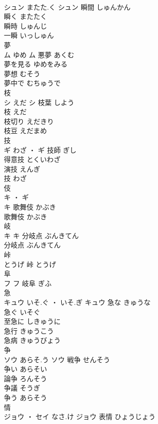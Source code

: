 \documentclass[8pt]{extreport}
\begin{document}
\begin{CJK}{UTF8}{min}
\\	シュン	またた.く	シュン	瞬間	しゅんかん	
\\	瞬く	またたく	
\\	瞬時	しゅんじ	
\\	一瞬	いっしゅん	
\\	夢	
\\	ム	ゆめ	ム	悪夢	あくむ	
\\	夢を見る	ゆめをみる	
\\	夢想	むそう	
\\	夢中で	むちゅうで	
\\	枝	
\\	シ	えだ	シ	枝葉	しよう	
\\	枝	えだ	
\\	枝切り	えだきり	
\\	枝豆	えだまめ	
\\	技	
\\	ギ	わざ ・	ギ	技師	ぎし	
\\	得意技	とくいわざ	
\\	演技	えんぎ	
\\	技	わざ	
\\	伎	
\\	キ ・ ギ
\\	キ	歌舞伎	かぶき	
\\	歌舞伎	かぶき	
\\	岐	
\\	キ		キ	分岐点	ぶんきてん	
\\	分岐点	ぶんきてん	
\\	峠	
\\	とうげ														峠	とうげ	
\\	阜	
\\	フ		フ													岐阜	ぎふ	
\\	急	
\\	キュウ	いそ.ぐ ・ いそ.ぎ	キュウ	急な	きゅうな	
\\	急ぐ	いそぐ	
\\	至急に	しきゅうに	
\\	急行	きゅうこう	
\\	急病	きゅうびょう	
\\	争	
\\	ソウ	あらそ.う	ソウ	戦争	せんそう	
\\	争い	あらそい	
\\	論争	ろんそう	
\\	争議	そうぎ	
\\	争う	あらそう	
\\	情	
\\	ジョウ ・ セイ	なさ.け	ジョウ	表情	ひょうじょう	

\end{CJK}
\end{document}

